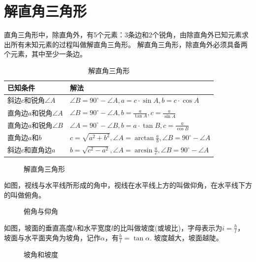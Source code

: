 \section{解直角三角形}
\begin{theorem}
    直角三角形中，除直角外，有5个元素：3条边和2个锐角，由除直角外已知元素求出所有未知元素的过程叫做解直角三角形。
    解直角三角形，除直角外必须具备两个元素，其中至少一条边。
\end{theorem}
\begin{table}[H]
    \centering
    \caption{解直角三角形}
    \begin{tabular}{l|l}
        \hline
        \hline
        已知条件                & 解法                                                                         \\
        \hline
        斜边$c$和锐角$\angle A$  & $\angle B=90^\circ-\angle A,a=c·\sin A,b=c·\cos A$                         \\
        直角边$a$和锐角$\angle A$ & $\angle B=90^\circ-\angle A,b=\frac{a}{\tan A},c=\frac{a}{\sin A}$         \\
        直角边$a$和锐角$\angle B$ & $\angle A=90^\circ-\angle B,b=a·\tan B,c=\frac{a}{\cos B}$                 \\
        直角边$a$和$b$          & $c=\sqrt{a^2+b^2},\angle A=\arctan \frac{a}{b},\angle B=90^\circ-\angle A$ \\
        斜边$c$和直角边$a$        & $b=\sqrt{c^2-a^2},\angle A=\arcsin \frac{a}{c},\angle B=90^\circ-\angle A$ \\
        \hline
        \hline
    \end{tabular}
\end{table}
\begin{figure}[H]
    \centering
    \resizebox{3cm}{!}{}
    \caption{解直角三角形}
\end{figure}
\begin{theorem}
    如图，视线与水平线所形成的角中，视线在水平线上方的叫做仰角，在水平线下方的叫做俯角。
\end{theorem}
\begin{figure}[H]
    \centering
    \resizebox{3cm}{!}{}
    \caption{俯角与仰角}
\end{figure}
\begin{theorem}
    如图，坡面的垂直高度$h$和水平宽度$l$的比叫做坡度(或坡比)，字母表示为$i=\frac{h}{l}$，
    坡面与水平面夹角为坡角，记作$\alpha$，有$\frac{h}{l}=\tan \alpha$. 坡度越大，坡面越陡。\\
\end{theorem}
\begin{figure}[H]
    \centering
    \resizebox{3cm}{!}{}
    \caption{坡角和坡度}
\end{figure}
\clearpage
